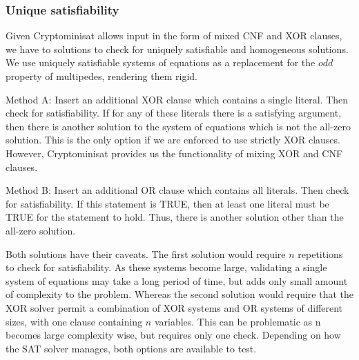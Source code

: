 \subsubsection{Unique satisfiability}
Given Cryptominisat allows input in the form of mixed CNF and XOR clauses, we have to solutions to check for uniquely satisfiable and homogeneous solutions. We use uniquely satisfiable systems of equations as a replacement for the $odd$ property of multipedes, rendering them rigid. 
\par
Method A: Insert an additional XOR clause which contains a single literal. Then check for satisfiability. If for any of these literals there is a satisfying argument, then there is another solution to the system of equations which is not the all-zero solution. This is the only option if we are enforced to use strictly XOR clauses. However, Cryptominisat provides us the functionality of mixing XOR and CNF clauses.
\par
Method B: Insert an additional OR clause which contains all literals. Then check for satisfiability. If this statement is TRUE, then at least one literal must be TRUE for the statement to hold. Thus, there is another solution other than the all-zero solution.
\par
Both solutions have their caveats. The first solution would require $n$ repetitions to check for satisfiability. As these systems become large, validating a single system of equations may take a long period of time, but adds only small amount of complexity to the problem. Whereas the second solution would require that the XOR solver permit a combination of XOR systems and OR systems of different sizes, with one clause containing $n$ variables. This can be problematic as n becomes large complexity wise, but requires only one check. Depending on how the SAT solver manages, both options are available to test.

